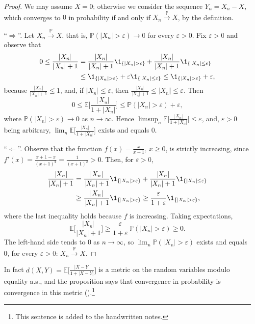 \begin{proof}
We may assume $X=0$; otherwise we consider the sequence $Y_n=X_n-X$, which converges to $0$ in
probability if and only if $X_n\xrightarrow{\mathbb P}X$, by the definition.

``$\Rightarrow$''. Let $X_n\xrightarrow{\mathbb P}X$, that is,
$\mathbb P(|X_n|>\varepsilon)\to0$ for every $\varepsilon>0$. Fix $\varepsilon>0$ and observe that
\[
\begin{aligned}
  0\le\frac{|X_n|}{|X_n|+1}
  &=\frac{|X_n|}{|X_n|+1}\1_{\{|X_n|>\varepsilon\}}+\frac{|X_n|}{|X_n|+1}\1_{\{|X_n|\le\varepsilon\}}\\
  &\le\1_{\{|X_n|>\varepsilon\}}+\varepsilon\1_{\{|X_n|\le\varepsilon\}}
  \le\1_{\{|X_n|>\varepsilon\}}+\varepsilon ,
\end{aligned}
\]
because $\frac{|X_n|}{|X_n|+1}\le1$, and, if $|X_n|\le\varepsilon$, then
$\frac{|X_n|}{|X_n|+1}\le|X_n|\le\varepsilon$. Then
\[
  0\le\mathbb E\bigg[\frac{|X_n|}{1+|X_n|}\bigg]\le\mathbb P(|X_n|>\varepsilon)+\varepsilon ,
\]
where $\mathbb P(|X_n|>\varepsilon)\to0$ as $n\to\infty$. Hence
$\limsup_n\mathbb E\big[\frac{|X_n|}{1+|X_n|}\big]\le\varepsilon$, and, $\varepsilon>0$ being
arbitrary, $\lim_n\mathbb E\big[\frac{|X_n|}{1+|X_n|}\big]$ exists and equals $0$.

``$\Leftarrow$''. Observe that the function $f(x)=\frac x{x+1}$, $x\ge0$, is strictly increasing,
since $f'(x)=\frac{x+1-x}{(x+1)^2}=\frac1{(x+1)^2}>0$. Then, for $\varepsilon>0$,
\[
\begin{aligned}
  \frac{|X_n|}{|X_n|+1}
  &=\frac{|X_n|}{|X_n|+1}\1_{\{|X_n|>\varepsilon\}}+\frac{|X_n|}{|X_n|+1}\1_{\{|X_n|\le\varepsilon\}}\\
  &\ge\frac{|X_n|}{|X_n|+1}\1_{\{|X_n|>\varepsilon\}}
  \ge\frac{\varepsilon}{1+\varepsilon}\1_{\{|X_n|>\varepsilon\}},
\end{aligned}
\]
where the last inequality holds because $f$ is increasing. Taking expectations,
\[
  \mathbb E\bigg[\frac{|X_n|}{|X_n|+1}\bigg]\ge\frac{\varepsilon}{1+\varepsilon}\,\mathbb P(|X_n|>\varepsilon)\ge0 .
\]
The left-hand side tends to $0$ as $n\to\infty$, so $\lim_n\mathbb P(|X_n|>\varepsilon)$ exists and
equals $0$, for every $\varepsilon>0$: $X_n\xrightarrow{\mathbb P}X$.
\end{proof}

In fact $d(X,Y)=\mathbb E\big[\frac{|X-Y|}{1+|X-Y|}\big]$ is a metric on the random variables
modulo equality a.s., and the proposition says that convergence in probability is convergence
in this metric ().\footnote{This sentence is added to the handwritten
notes.}

